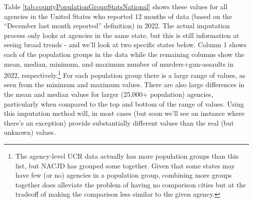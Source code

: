 \documentclass[
]{krantz}
\begin{document}
Table \ref{tab:countyPopulationGroupStatsNational} shows
these values for all agencies in the United States who
reported 12 months of data (based on the ``December last
month reported'' definition) in 2022. The actual imputation
process only looks at agencies in the same state, but this
is still information at seeing broad trends - and we'll look
at two specific states below. Column 1 shows each of the
population groups in the data while the remaining columns
show the mean, median, minimum, and maximum number of
murders+gun-assaults in 2022, respectively.\footnote{The
  agency-level UCR data actually has more population groups
  than this list, but NACJD has grouped some together. Given
  that some states may have few (or no) agencies in a
  population group, combining more groups together does
  alleviate the problem of having no comparison cities but
  at the tradeoff of making the comparison less similar to
  the given agency.} For each population group there is a
large range of values, as seen from the minimum and maximum
values. There are also large differences in the mean and
median values for larger (25,000+ population) agencies,
particularly when compared to the top and bottom of the
range of values. Using this imputation method will, in most
cases (but soon we'll see an instance where there's an
exception) provide substantially different values than the
real (but unknown) values.
\end{document}
